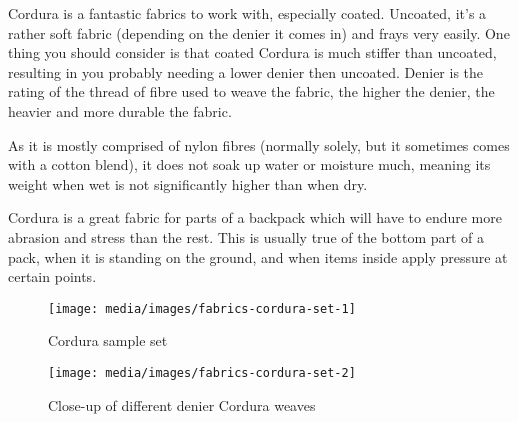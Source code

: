 Cordura is a fantastic fabrics to work with, especially coated. Uncoated, it's a rather soft fabric (depending on the denier it comes in) and frays very easily. One thing you should consider is that coated Cordura is much stiffer than uncoated, resulting in you probably needing a lower denier then uncoated. Denier is the rating of the thread of fibre used to weave the fabric, the higher the denier, the heavier and more durable the fabric.

As it is mostly comprised of nylon fibres (normally solely, but it sometimes comes with a cotton blend), it does not soak up water or moisture much, meaning its weight when wet is not significantly higher than when dry.

Cordura is a great fabric for parts of a backpack which will have to endure more abrasion and stress than the rest. This is usually true of the bottom part of a pack, when it is standing on the ground, and when items inside apply pressure at certain points.


\begin{figure}[H]
  \texttt{[image: media/images/fabrics-cordura-set-1]}
  \caption{Cordura sample set}
  \label{img:fabrics-cordura-set-1}
\end{figure}


\begin{figure}[H]
  \texttt{[image: media/images/fabrics-cordura-set-2]}
  \caption{Close-up of different denier Cordura weaves}
  \label{img:fabrics-cordura-set-2}
\end{figure}
